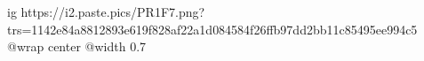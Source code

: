  
 
 
 
 

\ifcmt
  ig https://i2.paste.pics/PR1F7.png?trs=1142e84a8812893e619f828af22a1d084584f26ffb97dd2bb11c85495ee994c5
  @wrap center
  @width 0.7
\fi
